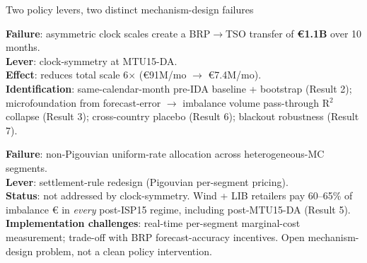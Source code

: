 \documentclass[aspectratio=169,10pt]{beamer}
\begin{document}
\begin{frame}{Two policy levers, two distinct mechanism-design failures}

\begin{tcolorbox}[colback=good!8, colframe=good, fonttitle=\bfseries,
  title={Lever 1 -- Clock-symmetry  \hfill \textcolor{good}{\textbf{IMPLEMENTED}}}]
\footnotesize
\textbf{Failure}: asymmetric clock scales create a BRP$\to$TSO transfer of \textbf{€1.1B} over 10 months. \\
\textbf{Lever}: clock-symmetry at MTU15-DA. \\
\textbf{Effect}: reduces total scale 6$\times$ (€91M/mo $\to$ €7.4M/mo). \\
\textbf{Identification}: same-calendar-month pre-IDA baseline + bootstrap (Result 2); microfoundation from forecast-error $\to$ imbalance volume pass-through R$^2$ collapse (Result 3); cross-country placebo (Result 6); blackout robustness (Result 7).
\end{tcolorbox}

\begin{tcolorbox}[colback=bad!8, colframe=bad, fonttitle=\bfseries,
  title={Lever 2 -- Settlement-rule redesign \hfill \textcolor{bad}{\textbf{OPEN}}}]
\footnotesize
\textbf{Failure}: non-Pigouvian uniform-rate allocation across heterogeneous-MC segments. \\
\textbf{Lever}: settlement-rule redesign (Pigouvian per-segment pricing). \\
\textbf{Status}: not addressed by clock-symmetry. Wind + LIB retailers pay 60--65\% of imbalance € in \emph{every} post-ISP15 regime, including post-MTU15-DA (Result 5). \\
\textbf{Implementation challenges}: real-time per-segment marginal-cost measurement; trade-off with BRP forecast-accuracy incentives. Open mechanism-design problem, not a clean policy intervention.
\end{tcolorbox}
\end{frame}
\end{document}
